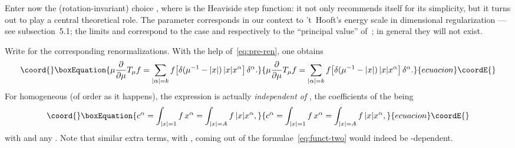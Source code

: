 \documentclass[a4paper,12pt]{article}
\renewcommand{\a}{\alpha}          %
\providecommand{\del}{\partial}        %
\providecommand{\dl}{\delta}           %
\providecommand{\7}{\dagger}           %
\theoremstyle{plain}
\theoremstyle{definition}
\begin{document}
Enter now the (rotation-invariant) choice
\coordHE{}, where \coordHE{} is the Heaviside step
function: it not only recommends itself for its simplicity, but it
turns out to play a central theoretical role. The parameter \myHighlight{$\mu$}\coordHE{}
corresponds in our context to 't~Hooft's energy scale in dimensional
regularization ---see subsection~5.1; the limits \coordHE{}
and \myHighlight{$\mu \uparrow \infty$}\coordHE{} correspond to the case \coordHE{} and
respectively to the ``principal value'' of~\coordHE{}; in general they will
not exist.

Write \coordHE{} for the corresponding renormalizations. With the help
of~\eqref{eq:pre-ren}, one obtains
\begin{equation}\coord{}\boxEquation{
\mu\frac{\del}{\del\mu} T_\mu f =
\sum_{|\a|=k} f\bigl[ \dl(\mu^{-1}-|x|)\,|x|x^\a \bigr]\,\dl^\a.
\label{eq:RG-form}
}{
\mu\frac{\del}{\del\mu} T_\mu f =
\sum_{|\a|=k} f\bigl[ \dl(\mu^{-1}-|x|)\,|x|x^\a \bigr]\,\dl^\a.
}{ecuacion}\coordE{}\end{equation}
For \coordHE{} homogeneous (of order \coordHE{} as it happens), the expression is
actually \textit{independent of} \myHighlight{$\mu$}\coordHE{}, the coefficients of the
\myHighlight{$\dl^\a$}\coordHE{} being
\begin{equation}\coord{}\boxEquation{
c^\a = \int_{|x|=1} f\,x^\a = \int_{|x|=A} f\,|x| x^\a,
\label{eq:c-coefs}
}{
c^\a = \int_{|x|=1} f\,x^\a = \int_{|x|=A} f\,|x| x^\a,
}{ecuacion}\coordE{}\end{equation}
with \myHighlight{$|\a| = k$}\coordHE{} and any \coordHE{}. Note that similar extra terms, with
\myHighlight{$|\a| < k$}\coordHE{}, coming out of the formulae~\eqref{eq:funct-two} would
indeed be \myHighlight{$\mu$}\coordHE{}-dependent.

\smallskip
\end{document}
